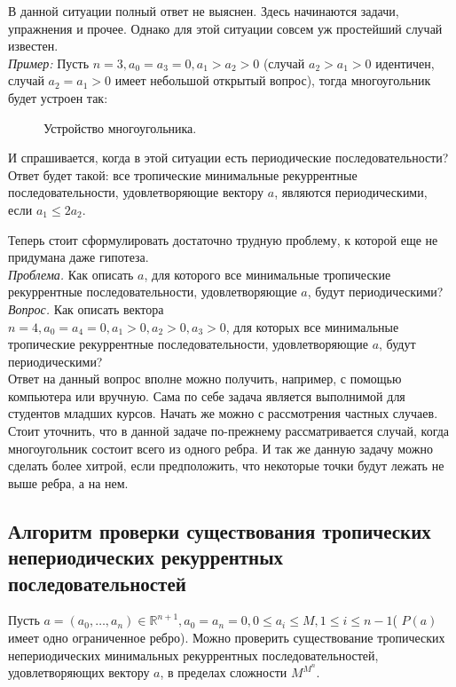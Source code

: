 \documentclass[russian]{lecture-notes}
\begin{document}
В данной ситуации полный ответ не выяснен. Здесь начинаются задачи, упражнения и прочее. Однако для этой ситуации совсем уж простейший случай известен. \\

\emph{Пример:}
\noindent Пусть $n=3, a_0 = a_3 = 0, a_1 > a_2 > 0$ (случай $a_2>a_1>0$ идентичен, случай $a_2=a_1>0$ имеет небольшой открытый вопрос), тогда многоугольник будет устроен так:

\begin{figure}[h]
\caption{Устройство многоугольника.}
\end{figure}

И спрашивается, когда в этой ситуации есть периодические последовательности? Ответ будет такой: все тропические минимальные рекуррентные последовательности, удовлетворяющие вектору $a$, являются периодическими, если $a_1 \le 2a_2$.

Теперь стоит сформулировать достаточно трудную проблему, к которой еще не придумана даже гипотеза. \\

\emph{Проблема.}
Как описать $a$, для которого все минимальные тропические рекуррентные последовательности, удовлетворяющие $a$, будут периодическими?\\


\emph{ Вопрос.}
Как описать вектора\\
$n=4, a_0=a_4=0, a_1>0, a_2>0, a_3>0$, для которых все минимальные тропические рекуррентные последовательности, удовлетворяющие $a$, будут периодическими?\\

Ответ на данный вопрос вполне можно получить, например, с помощью компьютера или вручную. Сама по себе задача является выполнимой для студентов младших курсов. Начать же можно с рассмотрения частных случаев. \\

Стоит уточнить, что в данной задаче по-прежнему рассматривается случай, когда многоугольник состоит всего из одного ребра. И так же данную задачу можно сделать более хитрой, если предположить, что некоторые точки будут лежать не выше ребра, а на нем.
\subsection{ Алгоритм проверки существования тропических непериодических рекуррентных последовательностей}

\begin{Theorem}
	 Пусть $a = (a_0,\ldots, a_n) \in \mathbb{R}^{n+1}, a_0=a_n=0, 0 \le a_i \le M, 1 \le i \le n-1$( $P(a)$ имеет одно ограниченное ребро). Можно проверить существование тропических непериодических минимальных рекуррентных последовательностей, удовлетворяющих вектору $a$, в пределах сложности $M^{M^n}$.\\
\end{Theorem}
\end{document}
